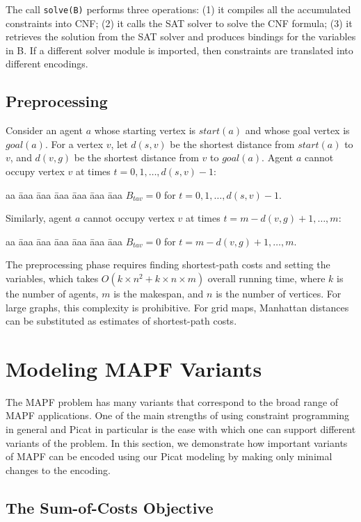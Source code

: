\documentclass[conference]{IEEEtran}
\begin{document}
The call \texttt{solve(B)} performs three operations: (1) it compiles all the accumulated constraints into CNF; (2) it calls the SAT solver to solve the CNF formula; (3) it retrieves the solution from the SAT solver and produces bindings for the variables in B. If a different solver module is imported, then constraints are translated into different encodings.

\subsection{\label{sec:improv}Preprocessing}
Consider an agent $a$ whose starting vertex is $start(a)$ and whose goal vertex is $goal(a)$. For a vertex $v$, let $d(s,v)$ be the shortest distance from $start(a)$ to $v$, and $d(v,g)$ be the shortest distance from $v$ to $goal(a)$. Agent $a$ cannot occupy vertex $v$ at times $t = 0, 1, \ldots, d(s,v)-1$:
\begin{tabbing}
aa \= aaa \= aaa \= aaa \= aaa \= aaa \= aaa \kill
\> $B_{t a v} = 0$ for $t = 0, 1, \ldots, d(s,v)-1$.
\end{tabbing}
Similarly, agent $a$ cannot occupy vertex $v$ at times $t = m-d(v,g)+1, \ldots, m$:
\begin{tabbing}
aa \= aaa \= aaa \= aaa \= aaa \= aaa \= aaa \kill
\> $B_{t a v} = 0$ for $t = m-d(v,g)+1, \ldots, m$.
\end{tabbing}

The preprocessing phase requires finding shortest-path costs and setting the variables, which takes $O(k\times n^2 + k \times n \times m)$ overall running time, where $k$ is the number of agents, $m$ is the makespan, and $n$ is the number of vertices.  For large graphs, this complexity is prohibitive. For grid maps, Manhattan distances can be substituted as estimates of shortest-path costs.

\section{Modeling MAPF Variants}
\label{sec:modelingMAPFVariants}
The MAPF problem has many variants that correspond to the broad range of MAPF applications. 
One of the main strengths of using constraint programming in general and Picat in particular is the ease with which one can support different variants of the problem. In this section, we demonstrate how important variants of MAPF can be  encoded using our Picat modeling by making only minimal changes to the encoding. 


\subsection{\label{sec:model}The Sum-of-Costs Objective}
\end{document}
